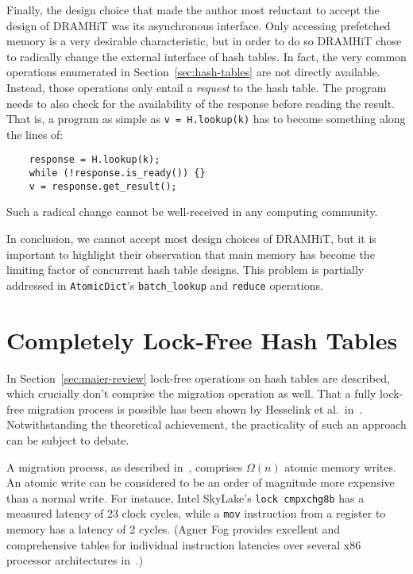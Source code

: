 Finally, the design choice that made the author most reluctant to accept the design of DRAMHiT was its asynchronous interface.
Only accessing prefetched memory is a very desirable characteristic, but in order to do so DRAMHiT chose to radically change the external interface of hash tables.
In fact, the very common operations enumerated in Section~\ref{sec:hash-tables} are not directly available.
Instead, those operations only entail a \emph{request} to the hash table.
The program needs to also check for the availability of the response before reading the result.
That is, a program as simple as \texttt{{v = H.lookup(k)}} has to become something along the lines of:
\begin{verbatim}
	response = H.lookup(k);
	while (!response.is_ready()) {}
	v = response.get_result();
\end{verbatim}
Such a radical change cannot be well-received in any computing community.

In conclusion, we cannot accept most design choices of DRAMHiT, but it is important to highlight their observation that main memory has become the limiting factor of concurrent hash table designs.
This problem is partially addressed in \texttt{AtomicDict}'s \texttt{{batch\_lookup}} and \texttt{reduce} operations.


\section{Completely Lock-Free Hash Tables}\label{sec:on-the-feasibility-of-completely-lock-free-hash-tables}

In Section~\ref{sec:maier-review} lock-free operations on hash tables are described, which crucially don't comprise the migration operation as well.
That a fully lock-free migration process is possible has been shown by Hesselink et al.\ in~\cite[\S3.5]{hesselink}.
Notwithstanding the theoretical achievement, the practicality of such an approach can be subject to debate.

A migration process, as described in~\cite{hesselink}, comprises $\Omega(n)$ atomic memory writes.
An atomic write can be considered to be an order of magnitude more expensive than a normal write.
For instance, Intel SkyLake's \texttt{lock~cmpxchg8b} has a measured latency of 23 clock cycles, while a \texttt{mov} instruction from a register to memory has a latency of 2 cycles.
(Agner Fog provides excellent and comprehensive tables for individual instruction latencies over several x86 processor architectures in~\cite{x86-instruction-tables}.)

